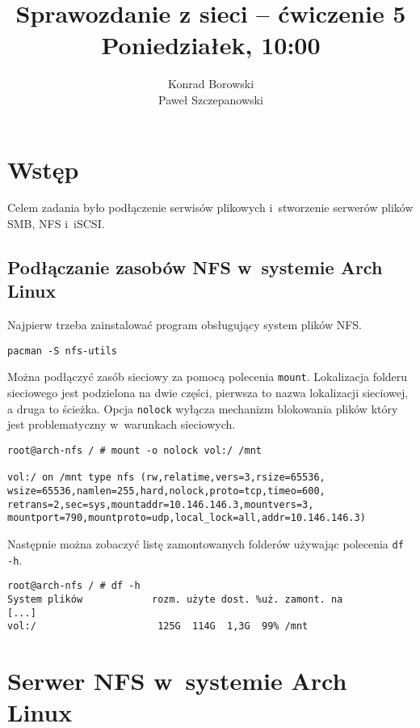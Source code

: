 \documentclass[a4paper,11pt]{article}
\title{Sprawozdanie z sieci -- ćwiczenie 5\\Poniedziałek, 10:00}
\author{Konrad Borowski\\Paweł Szczepanowski}
\begin{document}
\thispagestyle{empty}                   %

\maketitle

\section{Wstęp}

Celem zadania było podłączenie serwisów plikowych i~stworzenie serwerów
plików SMB, NFS i~iSCSI.

\subsection{Podłączanie zasobów NFS w~systemie Arch Linux}

Najpierw trzeba zainstalować program obsługujący system plików NFS.

\begin{verbatim}
pacman -S nfs-utils
\end{verbatim}

Można podłączyć zasób sieciowy za pomocą polecenia \verb|mount|.
Lokalizacja folderu sieciowego jest podzielona na dwie części,
pierwsza to nazwa lokalizacji sieciowej, a druga to ścieżka.
Opcja \verb|nolock| wyłącza mechanizm blokowania plików który jest
problematyczny w~warunkach sieciowych.

\begin{verbatim}
root@arch-nfs / # mount -o nolock vol:/ /mnt

vol:/ on /mnt type nfs (rw,relatime,vers=3,rsize=65536,
wsize=65536,namlen=255,hard,nolock,proto=tcp,timeo=600,
retrans=2,sec=sys,mountaddr=10.146.146.3,mountvers=3,
mountport=790,mountproto=udp,local_lock=all,addr=10.146.146.3)
\end{verbatim}

Następnie można zobaczyć listę zamontowanych folderów
używając polecenia \verb|df -h|.

\begin{verbatim}
root@arch-nfs / # df -h
System plików            rozm. użyte dost. %uż. zamont. na
[...]
vol:/                     125G  114G  1,3G  99% /mnt
\end{verbatim}

\section{Serwer NFS w~systemie Arch Linux}
\end{document}
